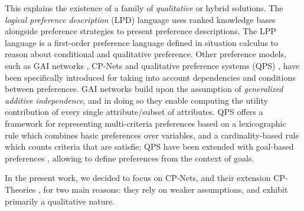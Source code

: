 
This explains the existence of a family of \textit{qualitative} or hybrid solutions. %
The \textit{logical preference description} (LPD) language \cite{Brewka2004} uses ranked knowledge bases alongside preference strategies to present preference descriptions. The LPP language \cite{Bienvenu2006} is a first-order preference language defined in situation calculus to reason about conditional and qualitative preference.
Other preference models, such as GAI networks \cite{Gonzales2004}, CP-Nets \cite{Boutilier2004} and qualitative preference systems (QPS) \cite{Visser2012QPS}, have been specifically introduced for taking into account dependencies and conditions between preferences. GAI networks build upon the assumption of \textit{generalized additive independence}, and in doing so they enable computing the utility contribution of every single attribute/subset of attributes. QPS offers a framework for representing multi-criteria preferences based on a lexicographic rule which combines basic preferences over variables, and a cardinality-based rule which counts criteria that are satisfie; QPS have been extended with goal-based preferences \cite{Visser2013QPS}, allowing to define preferences from the context of goals.

In the present work, we decided to focus on CP-Nets, and their extension CP-Theories \cite{Wilson2004}, for two main reasons: they rely on weaker assumptions, and exhibit primarily a qualitative nature. 


